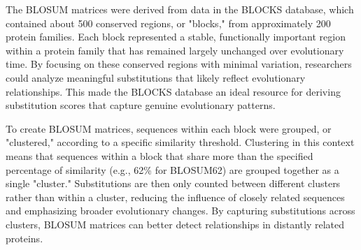The BLOSUM matrices were derived from data in the BLOCKS database, which contained about 500 conserved regions, or "blocks," from approximately 200 protein families.
Each block represented a stable, functionally important region within a protein family that has remained largely unchanged over evolutionary time. By focusing on these conserved regions with minimal variation, researchers could analyze meaningful substitutions that likely reflect evolutionary relationships. This made the BLOCKS database an ideal resource for deriving substitution scores that capture genuine evolutionary patterns.

To create BLOSUM matrices, sequences within each block were grouped, or "clustered," according to a specific similarity threshold. Clustering in this context means that sequences within a block that share more than the specified percentage of similarity (e.g., 62\% for BLOSUM62) are grouped together as a single "cluster." Substitutions are then only counted between different clusters rather than within a cluster, reducing the influence of closely related sequences and emphasizing broader evolutionary changes. By capturing substitutions across clusters, BLOSUM matrices can better detect relationships in distantly related proteins.

